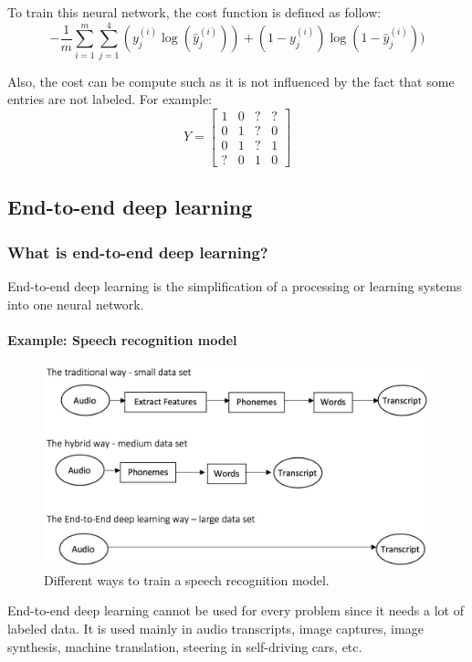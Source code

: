 \documentclass[UTF8]{article}
\newcommand{\Matrix}[1]{\boldsymbol{\mathit{#1}}}   %
\begin{document}
To train this neural network, the cost function is defined as follow:
$$ -\frac{1}{m} \sum_{i=1}^m \sum_{j=1}^4 (y_j^{(i)} \log(\hat{y}_j^{(i)})) + (1-y_j^{(i)})
\log(1-\hat{y}_j^{(i)})) $$

Also, the cost can be compute such as it is not influenced by the fact that some entries are not
labeled. For example:
$$ \Matrix{Y} = \left[\begin{array}{cccc} 1 & 0 & ? & ? \\ 0 & 1 & ? & 0 \\ 0 & 1 & ? & 1 \\
? & 0 & 1 & 0 \end{array}\right] $$

\subsection{End-to-end deep learning}
\subsubsection{What is end-to-end deep learning?}
End-to-end deep learning is the simplification of a processing or learning systems into one neural
network.

\paragraph{Example: Speech recognition model}
\begin{figure}[htb]
    \centering
    \includegraphics[width=45em]{figures/end-to-end-learning}
    \caption{Different ways to train a speech recognition model.}
    \label{fig:end-to-end-learning}
\end{figure}

End-to-end deep learning cannot be used for every problem since it needs a lot of labeled data. It
is used mainly in audio transcripts, image captures, image synthesis, machine translation, steering
in self-driving cars, etc.
\end{document}

